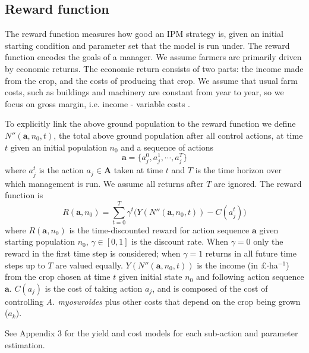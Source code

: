 \documentclass[12pt, a4paper]{article}
\begin{document}
\subsection*{Reward function}
The reward function measures how good an IPM strategy is, given an initial starting condition and parameter set that the model is run under. The reward function encodes the goals of a manager. We assume farmers are primarily driven by economic returns. The economic return consists of two parts: the income made from the crop, and the costs of producing that crop. We assume that usual farm costs, such as buildings and machinery are constant from year to year, so we focus on gross margin, i.e. income - variable costs \citep[pp.~3--4]{Nix2016}. 

To explicitly link the above ground population to the reward function we define $N''(\mathbf{a}, n_0, t)$, the total above ground population after all control actions, at time $t$ given an initial population $n_0$ and a sequence of actions 
\begin{equation}
	\mathbf{a} = \{a_j^0, a_j^1, \cdots, a_j^T\}
\end{equation}	  
where $a_j^t$ is the action $a_j \in \mathbf{A}$ taken at time $t$ and $T$ is the time horizon over which management is run. We assume all returns after $T$ are ignored. The reward function is  
\begin{equation}
	R(\mathbf{a}, n_0) = \sum_{t=0}^T \gamma^t \Big( Y(N''(\mathbf{a}, n_0, t)) - C(a_j^t) \Big)
\end{equation}
where $R(\mathbf{a}, n_0)$ is the time-discounted reward for action sequence $\mathbf{a}$ given starting population $n_0$, $\gamma \in [0, 1]$ is the discount rate. When $\gamma = 0$ only the reward in the first time step is considered; when $\gamma = 1$ returns in all future time steps up to $T$ are valued equally. $Y(N''(\mathbf{a}, n_0, t))$ is the income (in \pounds$\cdot$ha$^{-1}$) from the crop chosen at time $t$ given initial state $n_0$ and following action sequence $\mathbf{a}$. $C(a_j)$ is the cost of taking action $a_j$, and is composed of the cost of controlling \textit{A. myosuroides} plus other costs that depend on the crop being grown ($a_k$).   

See Appendix 3 for the yield and cost models for each sub-action and parameter estimation.
\end{document}

